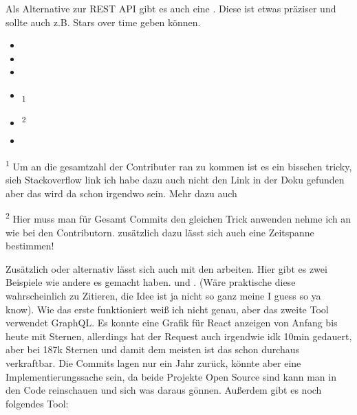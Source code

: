 Als Alternative zur REST API gibt es auch eine . Diese ist etwas präziser und sollte auch
z.B. Stars over time geben können.

\begin{itemize}
    \item {}
    \item {}
    \item {}
    \item {} \textsubscript{1}
    \item {} \textsuperscript{2}
    \item {}
\end{itemize}

\noindent
\textsuperscript{1} Um an die gesamtzahl der Contributer ran zu kommen ist es ein bisschen tricky, sieh Stackoverflow link
ich habe dazu auch nicht den Link in der Doku gefunden aber das wird da schon irgendwo sein. Mehr dazu auch

\bigskip

\noindent
\textsuperscript{2} Hier muss man für Gesamt Commits den gleichen Trick anwenden nehme ich an wie bei den Contributorn.
zusätzlich dazu lässt sich auch eine Zeitspanne bestimmen!

\bigskip

Zusätzlich oder alternativ lässt sich auch mit den  
arbeiten. Hier gibt es zwei Beispiele wie andere es gemacht haben. 
und . (Wäre praktische diese wahrscheinlich zu Zitieren,
die Idee ist ja nicht so ganz meine I guess so ya know). Wie das erste funktioniert weiß ich nicht genau, aber das zweite
Tool verwendet GraphQL. Es konnte eine Grafik für React anzeigen von Anfang bis heute mit Sternen, allerdings hat der Request
auch irgendwie idk 10min gedauert, aber bei 187k Sternen und damit dem meisten ist das schon durchaus verkraftbar.
Die Commits lagen nur ein Jahr zurück, könnte aber eine Implementierungssache sein, da beide Projekte Open Source sind
kann man in den Code reinschauen und sich was daraus gönnen. Außerdem gibt es noch folgendes Tool: 

